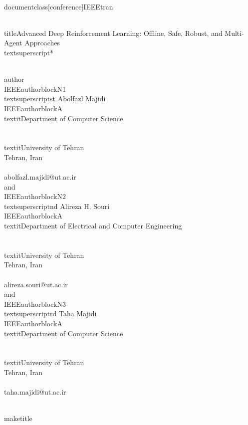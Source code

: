 \\documentclass[conference]{IEEEtran}
\begin{document}
\\title{Advanced Deep Reinforcement Learning: Offline, Safe, Robust, and Multi-Agent Approaches\\textsuperscript{*}}

\\author{\\IEEEauthorblockN{1\\textsuperscript{st} Abolfazl Majidi}
\\IEEEauthorblockA{\\textit{Department of Computer Science} \\\\
\\textit{University of Tehran}\\
Tehran, Iran \\\\
abolfazl.majidi@ut.ac.ir}
\\and
\\IEEEauthorblockN{2\\textsuperscript{nd} Alireza H. Souri}
\\IEEEauthorblockA{\\textit{Department of Electrical and Computer Engineering} \\\\
\\textit{University of Tehran}\\
Tehran, Iran \\\\
alireza.souri@ut.ac.ir}
\\and
\\IEEEauthorblockN{3\\textsuperscript{rd} Taha Majidi}
\\IEEEauthorblockA{\\textit{Department of Computer Science} \\\\
\\textit{University of Tehran}\\
Tehran, Iran \\\\
taha.majidi@ut.ac.ir}
}

\\maketitle
\end{document}
